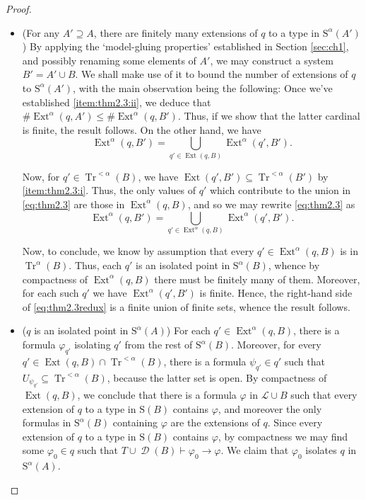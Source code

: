 \documentclass{article}
\theoremstyle{nonumberplain}
\newtheorem{proof}{Proof}
\newcommand{\Lang}{\mathcal{L}}
\newcommand{\Stone}{\mathrm{S}}
\DeclareMathOperator{\Tr}{Tr}
\DeclareMathOperator{\Ext}{Ext}
\DeclareMathOperator{\ADG}{\mathcal{D}}
\newcommand{\card}[1]{\#{#1}}
\begin{document}
\begin{proof}
\begin{itemize}
\item (For any $A' \supseteq A$, there are finitely many extensions of $q$ to a type in $\Stone^\alpha(A')$) By applying the `model-gluing properties' established in Section \ref{sec:ch1}, and possibly renaming some elements of $A'$, we may construct a system $B' = A' \cup B$. We shall make use of it to bound the number of extensions of $q$ to $\Stone^\alpha(A')$, with the main observation being the following: Once we've established \ref{item:thm2.3:ii}, we deduce that $\card{\Ext^\alpha(q,A')} \leq \card{\Ext^\alpha(q,B')}$. Thus, if we show that the latter cardinal is finite, the result follows. On the other hand, we have
\begin{equation}\label{eq:thm2.3}
\Ext^\alpha(q,B') = \bigcup_{q' \in \Ext(q,B)} \Ext^\alpha(q', B').
\end{equation}

Now, for $q' \in \Tr^{<\alpha}(B)$, we have $\Ext(q',B') \subseteq \Tr^{<\alpha}(B')$ by \ref{item:thm2.3:i}. Thus, the only values of $q'$ which contribute to the union in \eqref{eq:thm2.3} are those in $\Ext^\alpha(q,B)$, and so we may rewrite \ref{eq:thm2.3} as
\begin{equation}\label{eq:thm2.3redux}
\Ext^\alpha(q,B') = \bigcup_{q' \in \Ext^\alpha(q,B)} \Ext^\alpha(q', B').
\end{equation}

Now, to conclude, we know by assumption that every $q' \in \Ext^\alpha(q,B)$ is in $\Tr^\alpha(B)$. Thus, each $q'$ is an isolated point in $\Stone^\alpha(B)$, whence by compactness of $\Ext^\alpha(q,B)$ there must be finitely many of them. Moreover, for each such $q'$ we have $\Ext^\alpha(q',B')$ is finite. Hence, the right-hand side of \eqref{eq:thm2.3redux} is a finite union of finite sets, whence the result follows.


\item ($q$ is an isolated point in $\Stone^\alpha(A)$) For each $q' \in \Ext^\alpha(q,B)$, there is a formula $\varphi_{q'}$ isolating $q'$ from the rest of $\Stone^\alpha(B)$. Moreover, for every $q' \in \Ext(q,B) \cap \Tr^{<\alpha}(B)$, there is a formula $\psi_{q'} \in q'$ such that $U_{\psi_{q'}} \subseteq \Tr^{<\alpha}(B)$, because the latter set is open. By compactness of $\Ext(q,B)$, we conclude that there is a formula $\varphi$ in $\Lang \cup B$ such that every extension of $q$ to a type in $\Stone(B)$ contains $\varphi$, and moreover the only formulas in $\Stone^\alpha(B)$ containing $\varphi$ are the extensions of $q$. Since every extension of $q$ to a type in $\Stone(B)$ contains $\varphi$, by compactness we may find some $\varphi_0 \in q$ such that $T \cup \ADG(B) \vdash \varphi_0 \rightarrow \varphi$. We claim that $\varphi_0$ isolates $q$ in $\Stone^\alpha(A)$.


\end{itemize}
\end{proof}
\end{document}

